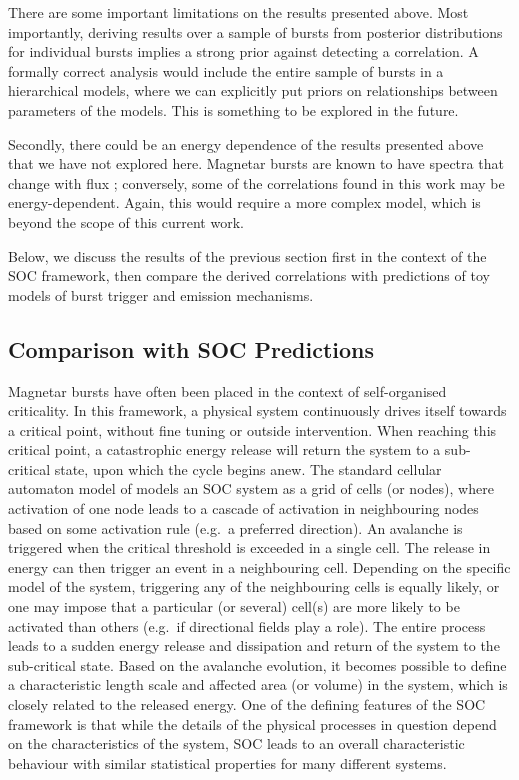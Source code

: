 \documentclass[12pt]{emulateapj}
\begin{document}
There are some important limitations on the results presented above. Most importantly, deriving results over a sample of bursts from posterior distributions for individual bursts
implies a strong prior against detecting a correlation. A formally correct analysis would include the entire sample of bursts in a hierarchical models, where we can explicitly put
priors on relationships between parameters of the models. This is something to be explored in the future.

Secondly, there could be an energy dependence of the results presented above that we have not explored here. Magnetar bursts are known to have spectra that change with flux 
\citep[e.g.\ ][]{younes2013}; conversely, some of the correlations found in this work may be energy-dependent. Again, this would require a more complex model, which is beyond the 
scope of this current work.

Below, we discuss the results of the previous section first in the context of the SOC framework, then compare the derived correlations with predictions of toy models of burst trigger and
emission mechanisms.

\subsection{Comparison with SOC Predictions}
\label{ch6:soc}

Magnetar bursts have often been placed in the context of self-organised criticality. In this framework, a physical system continuously drives
itself towards a critical point, without fine tuning or outside intervention. When reaching this critical point, a catastrophic energy
release will return the system to a sub-critical state, upon which the cycle begins anew. The standard cellular automaton model of \citet{bak1987} models an 
SOC system as a grid of cells (or nodes), where activation of one node leads to a cascade of activation in neighbouring nodes based on some activation rule 
(e.g.\ a preferred direction). An avalanche is triggered when the critical threshold is exceeded in a single cell. The release in energy can then trigger an event in a neighbouring cell. Depending
on the specific model of the system, triggering any of the neighbouring cells is equally likely, or one may impose that a particular (or several) cell(s) are more likely to be activated than others (e.g.\
if directional fields play a role).
The entire process leads to a sudden energy release and dissipation and return of the system to the sub-critical state.
Based on the avalanche evolution, it becomes possible to define a characteristic length scale and affected 
area (or volume) in the system, which is closely related to the released energy. 
One of the defining features of the SOC framework is that while the details of the physical processes in question depend on the characteristics
of the system, SOC leads to an overall characteristic behaviour with similar statistical properties for many different systems. 
\end{document}
